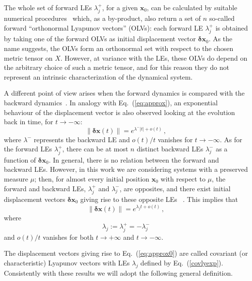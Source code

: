 \documentclass{article}
\theoremstyle{plain}
\theoremstyle{definition}
\theoremstyle{remark}
\newcommand{\vect}[1]{\boldsymbol{#1}}
\providecommand{\detail}[1]{#1}
\renewcommand{\detail}[1]{}
\begin{document}
The whole set of forward LEs $\lambda_j^+$, for a given $\vect{x}_0$,
can be calculated by suitable numerical procedures~\cite{benettin1980,
  shimada1979} which, as a by-product, also return a set of $n$
so-called forward ``orthonormal Lyapunov vectors'' (OLVs): each
forward LE $\lambda_j^+$ is obtained by taking one of the forward OLVs
as initial displacement vector $\vect{\delta x}_0$. As the name
suggests, the OLVs form an orthonormal set with respect to the chosen
metric tensor on $X$. However, at variance with the LEs, these OLVs do
depend on the arbitrary choice of such a metric tensor, and for this
reason they do not represent an intrinsic characterization of the
dynamical system.

A different point of view arises when the forward dynamics is compared
with the backward dynamics~\cite{pikovsky}. \detail{page 56} In
analogy with Eq.~(\ref{eq:approx}), an exponential behaviour of the
displacement vector is also observed looking at the evolution back in time,
for $t\to -\infty$:
\begin{equation}
  \lVert \vect{\delta x}(t) \rVert =
e^{\lambda^- |t|+o(t)} \, ,
  \label{eq:approx-}
\end{equation}
where $\lambda^-$ represents the backward LE and $o(t)/t$ vanishes for
$t\to -\infty$.  As for the forward LEs $\lambda_j^+$, there can be at
most $n$ distinct backward LEs $\lambda_j^-$ as a function of
$\vect{\delta x}_0$.  In general, there is no relation between the
forward and backward LEs.  However, in this work we are considering
systems with a preserved measure $\mu$; then, for almost every initial
position $\vect{x}_0$ with respect to $\mu$, \detail{theorem 3.1, page
  283} the forward and backward LEs, $\lambda_j^+$ and $\lambda_j^-$,
are opposites, and there exist initial displacement vectors
$\vect{\delta x}_0$ giving rise to these opposite LEs
~\cite{ruelle1979}. This implies that
\begin{equation}
  \lVert \vect{\delta x}(t) \rVert =
e^{\lambda_j t + o(t)} \, ,
  \label{eq:approx0}
\end{equation}
where  
\begin{equation}\label{covlyexp}
\lambda_j :=  \lambda_j^+ = -\lambda_j^- 
\end{equation}
and $o(t)/t$ vanishes for both $t\to +\infty$ and $t\to -\infty$.

The displacement vectors giving rise to Eq.~(\ref{eq:approx0}) are called
covariant (or characteristic) Lyapunov vectors with LEs $\lambda_j$
defined by Eq.~(\ref{covlyexp}).  \detail{theorem 3.1,
  page 283} \detail{also in \cite{pikovsky}, eq. 4.4 page 57 and
  \cite{kuptsov2012} Eq. 39}  Consistently with these results we will
adopt the following general definition.
\end{document}
